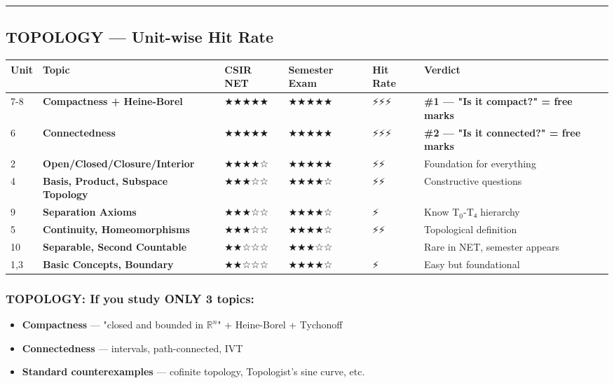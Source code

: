 \documentclass[12pt,a4paper,openany]{book}
\begin{document}
{\bigskip\noindent\rule{\textwidth}{0.4pt}\bigskip

\subsection{ TOPOLOGY — Unit-wise Hit Rate}

\begin{center}
\begin{tabular}{|l|l|l|l|l|l|}
\hline
\textbf{Unit} & \textbf{Topic} & \textbf{CSIR NET} & \textbf{Semester Exam} & \textbf{Hit Rate} & \textbf{Verdict} \\
\hline
7-8 & \textbf{Compactness + Heine-Borel} & ★★★★★ & ★★★★★ & ⚡⚡⚡ & \textbf{\#1 — "Is it compact?" = free marks} \\
\hline
6 & \textbf{Connectedness} & ★★★★★ & ★★★★★ & ⚡⚡⚡ & \textbf{\#2 — "Is it connected?" = free marks} \\
\hline
2 & \textbf{Open/Closed/Closure/Interior} & ★★★★☆ & ★★★★★ & ⚡⚡ & Foundation for everything \\
\hline
4 & \textbf{Basis, Product, Subspace Topology} & ★★★☆☆ & ★★★★☆ & ⚡⚡ & Constructive questions \\
\hline
9 & \textbf{Separation Axioms} & ★★★☆☆ & ★★★★☆ & ⚡ & Know T$_0$-T₄ hierarchy \\
\hline
5 & \textbf{Continuity, Homeomorphisms} & ★★★☆☆ & ★★★★☆ & ⚡⚡ & Topological definition \\
\hline
10 & \textbf{Separable, Second Countable} & ★★☆☆☆ & ★★★☆☆ &  & Rare in NET, semester appears \\
\hline
1,3 & \textbf{Basic Concepts, Boundary} & ★★☆☆☆ & ★★★★☆ & ⚡ & Easy but foundational \\
\hline
\end{tabular}
\end{center}

\subsubsection{ TOPOLOGY: If you study ONLY 3 topics:}
\begin{itemize}
  \item \textbf{Compactness} — "closed and bounded in $\mathbb{R}^n$" + Heine-Borel + Tychonoff
  \item \textbf{Connectedness} — intervals, path-connected, IVT
  \item \textbf{Standard counterexamples} — cofinite topology, Topologist's sine curve, etc.
\end{itemize}

}
\end{document}
